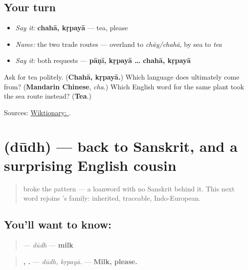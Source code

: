 \subsection*{Your turn}
\begin{itemize}
\raggedright
  \item \emph{Say it:} \textbf{chahā, kṛpayā} — tea, please
  \item \emph{Name:} the two trade routes — overland to \emph{chāy/chahā}, by sea to \emph{tea}
  \item \emph{Say it:} both requests — \textbf{pāṇī, kṛpayā … chahā, kṛpayā}
\end{itemize}

\begin{tcolorbox}[breakable,colback=teal!4,colframe=teal!35!black,title={Before you move on}]
Ask for tea politely. (\textbf{Chahā, kṛpayā.}) Which language does \textbf{} ultimately come from? (\textbf{Mandarin Chinese}, \emph{cha}.) Which English word for the same plant took the sea route instead? (\textbf{Tea}.)

Sources: \href{https://en.wiktionary.org/wiki/\%E0\%A4\%9A\%E0\%A4\%B9\%E0\%A4\%BE}{Wiktionary: }.
\end{tcolorbox}
\section[\texorpdfstring{\mr{दूध} (dūdh)}{दूध (dūdh)}]{ (dūdh) — back to Sanskrit, and a surprising English cousin}

\label{lesson:MR-C10-dudh}



\begin{quote}
\textbf{} broke the pattern — a loanword with no Sanskrit behind it. This next word rejoins \textbf{}'s family: inherited, traceable, Indo-European.
\end{quote}

\subsection*{You'll want to know: }
\begin{quote}
\textbf{} — \emph{dūdh} — \textbf{milk}
\end{quote}

\begin{quote}
\textbf{, .} — \emph{dūdh, kṛpayā.} — \textbf{Milk, please.}
\end{quote}

